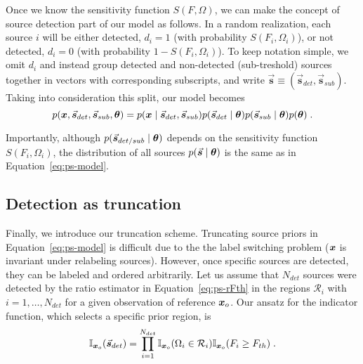 Once we know the sensitivity function $S(F, \Omega)$, we can make the concept of source detection part of our model as follows.  In a random realization, each source $i$ will be either detected, $d_i= 1$ (with probability $S(F_i, \Omega_i)$), or not detected, $d_i=0$ (with probability $1-S(F_i, \Omega_i)$).  To keep notation simple, we omit $d_i$ and instead group detected and non-detected (sub-treshold) sources together in vectors with corresponding subscripts, and write $\vec{\boldsymbol{s}} \equiv (\vec{\boldsymbol{s}}_{det}, \vec{\boldsymbol{s}}_{sub})$.
Taking into consideration this split, our model becomes
\begin{equation}
    p(\bm{x}, \vec{\boldsymbol{s}}_{det}, \vec{\boldsymbol{s}}_{sub}, \bm{\theta}) = p(\bm{x}\mid  \vec{\boldsymbol{s}}_{det}, \vec{\boldsymbol{s}}_{sub})
    p(\vec{\boldsymbol{s}}_{det}\mid \bm{\theta}) 
    p(\vec{\boldsymbol{s}}_{sub}\mid \bm{\theta}) 
    p(\bm{\theta})\;.
    \label{eq:ps-splitmodel}
\end{equation}

Importantly, although $p(\vec{\boldsymbol{s}}_{det/sub}\mid \bm{\theta})$ depends on the sensitivity function $S(F_i, \Omega_i)$, the distribution of all sources $p(\vec{\boldsymbol{s}}\mid \bm{\theta})$ is the same as in Equation~\eqref{eq:ps-model}.


\subsection{Detection as truncation} \label{subsec:ps-truncation}

Finally, we introduce our truncation scheme. 
Truncating source priors in Equation~\eqref{eq:ps-model} is difficult due to the the label switching problem ($\bm{x}$ is invariant under relabeling sources). However, once specific sources are detected, they can be labeled and ordered arbitrarily. Let us assume that $N_{det}$ sources were detected by the ratio estimator in Equation~\eqref{eq:ps-rFth} in the regions $\mathcal{R}_i$ with $i = 1, \dots, N_{det}$ for a given observation of reference $\bm{x}_o$.  Our ansatz for the indicator function, which selects a specific prior region, is
\begin{equation}
    \mathbb{I}_{\bm{x}_o}(\vec{\boldsymbol{s}}_{det}) = \prod_{i=1}^{N_{det}}
    \mathbb{I}_{\bm{x}_o}(\Omega_i \in \mathcal{R}_i)
    \mathbb{I}_{\bm{x}_o}(F_i \geq F_{th})\;.
    \label{eq:ps-I}
\end{equation}


